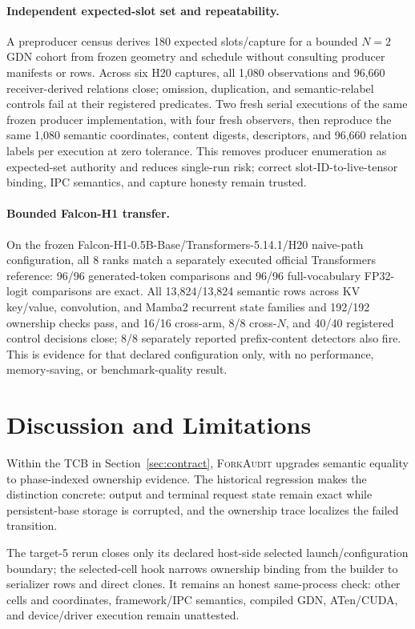 \documentclass{article}
\newcommand{\method}{\textsc{ForkAudit}}
\begin{document}
\paragraph{Independent expected-slot set and repeatability.}
A preproducer census derives 180 expected slots/capture for a bounded $N=2$ GDN
cohort from frozen geometry and schedule without consulting producer manifests
or rows.  Across six H20 captures, all 1,080 observations and 96,660
receiver-derived relations close; omission, duplication, and semantic-relabel
controls fail at their registered predicates.  Two fresh serial executions of
the same frozen producer implementation, with four fresh observers, then
reproduce the same 1,080 semantic coordinates, content digests, descriptors, and
96,660 relation labels per execution at zero tolerance.  This removes producer
enumeration as expected-set authority and reduces single-run risk; correct
slot-ID-to-live-tensor binding, IPC semantics, and capture honesty remain trusted.

\paragraph{Bounded Falcon-H1 transfer.}
On the frozen Falcon-H1-0.5B-Base/Transformers-5.14.1/H20 naive-path
configuration, all 8 ranks match a separately executed official Transformers
reference: 96/96 generated-token comparisons
and 96/96 full-vocabulary FP32-logit comparisons are exact.  All
13,824/13,824 semantic rows across KV key/value, convolution, and Mamba2
recurrent state families and 192/192 ownership checks pass, and
16/16 cross-arm, 8/8 cross-$N$, and 40/40 registered control decisions close;
8/8 separately reported prefix-content detectors also fire.  This is evidence
for that declared configuration only, with no performance, memory-saving, or
benchmark-quality result.

\section{Discussion and Limitations}
\label{sec:limitations}

Within the TCB in Section~\ref{sec:contract}, \method{} upgrades semantic
equality to phase-indexed ownership evidence.  The historical regression makes
the distinction concrete: output and terminal request state remain exact while
persistent-base storage is corrupted, and the ownership trace localizes the
failed transition.

The target-5 rerun closes only its declared host-side selected
launch/configuration boundary; the selected-cell hook narrows ownership binding from
the builder to serializer rows and direct clones.  It remains an honest
same-process check: other cells and coordinates, framework/IPC semantics,
compiled GDN, ATen/CUDA, and device/driver execution remain unattested.
\end{document}

